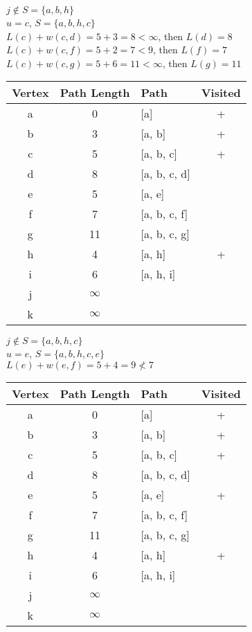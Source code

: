 \documentclass[12pt]{article}
\begin{document}
$j \notin S = \{a, b, h\}$ \\
$u = c$, $S = \{a, b, h, c\}$ \\
$L(c) + w(c, d) = 5 + 3 = 8 < \infty$, then $L(d) = 8$ \\
$L(c) + w(c, f) = 5 + 2 = 7 < 9$, then $L(f) = 7$ \\
$L(c) + w(c, g) = 5 + 6 = 11 < \infty$, then $L(g) = 11$ \\

\begin{center}
\begin{tabular}{c|c|l|c}
    Vertex & Path Length & Path & Visited \\
    \hline
    a & 0 & [a] & + \\
    b & 3 & [a, b] & + \\
    c & 5 & [a, b, c] & + \\
    d & 8 & [a, b, c, d] & \\
    e & 5 & [a, e] & \\
    f & 7 & [a, b, c, f] & \\
    g & 11 & [a, b, c, g] & \\
    h & 4 & [a, h] & + \\
    i & 6 & [a, h, i] & \\
    j & $\infty$ & & \\
    k & $\infty$ & &
\end{tabular}
\end{center}

$j \notin S = \{a, b, h, c\}$ \\
$u = e$, $S = \{a, b, h, c, e\}$ \\
$L(e) + w(e, f) = 5 + 4 = 9 \not< 7$ \\

\begin{center}
\begin{tabular}{c|c|l|c}
    Vertex & Path Length & Path & Visited \\
    \hline
    a & 0 & [a] & + \\
    b & 3 & [a, b] & + \\
    c & 5 & [a, b, c] & + \\
    d & 8 & [a, b, c, d] & \\
    e & 5 & [a, e] & + \\
    f & 7 & [a, b, c, f] & \\
    g & 11 & [a, b, c, g] & \\
    h & 4 & [a, h] & + \\
    i & 6 & [a, h, i] & \\
    j & $\infty$ & & \\
    k & $\infty$ & &
\end{tabular}
\end{center}
\end{document}
